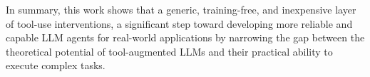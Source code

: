 In summary, this work shows that a generic, training-free, and inexpensive layer of tool-use interventions,
 a significant step toward developing more reliable and 
capable LLM agents for real-world applications by narrowing the gap between the 
theoretical potential of tool-augmented LLMs and their practical ability to execute complex tasks.
